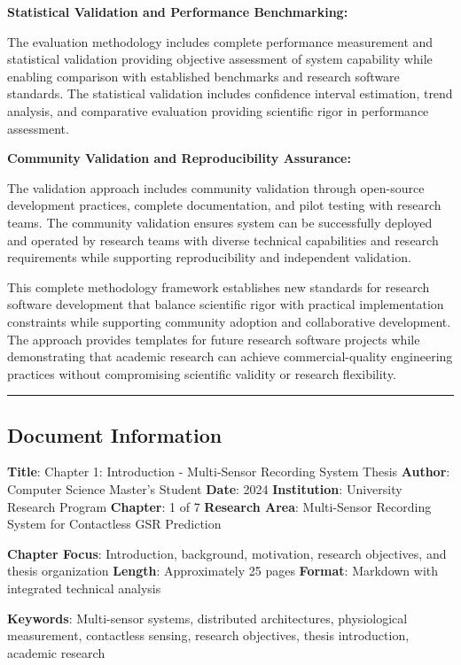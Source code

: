 \documentclass[11pt,a4paper]{article}
\begin{document}
\textbf{Statistical Validation and Performance Benchmarking:}

The evaluation methodology includes complete performance measurement and statistical
validation providing objective
assessment of system capability while enabling comparison with established benchmarks
and research software standards.
The statistical validation includes confidence interval estimation, trend analysis,
and comparative evaluation providing
scientific rigor in performance assessment.

\textbf{Community Validation and Reproducibility Assurance:}

The validation approach includes community validation through open-source development
practices, complete
documentation, and pilot testing with research teams.  The community validation
ensures system can be successfully
deployed and operated by research teams with diverse technical capabilities and
research requirements while supporting
reproducibility and independent validation.

This complete methodology framework establishes new standards for research software
development that balance
scientific rigor with practical implementation constraints while supporting community
adoption and collaborative
development.  The approach provides templates for future research software projects
while demonstrating that academic
research can achieve commercial-quality engineering practices without compromising
scientific validity or research
flexibility.

\hrule

\subsection{Document Information}

\textbf{Title}: Chapter 1: Introduction - Multi-Sensor Recording System Thesis
\textbf{Author}: Computer Science Master's Student
\textbf{Date}: 2024
\textbf{Institution}: University Research Program
\textbf{Chapter}: 1 of 7
\textbf{Research Area}: Multi-Sensor Recording System for Contactless GSR Prediction

\textbf{Chapter Focus}: Introduction, background, motivation, research objectives, and thesis organization
\textbf{Length}: Approximately 25 pages
\textbf{Format}: Markdown with integrated technical analysis

\textbf{Keywords}: Multi-sensor systems, distributed architectures, physiological measurement, contactless sensing, research
objectives, thesis introduction, academic research
\end{document}
